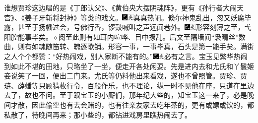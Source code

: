 谁想贾珍这边唱的是《丁郎认父》、《黄伯央大摆阴魂阵》，更有《孙行者大闹天宫》、《姜子牙斩将封神》等类的戏文。{\includegraphics[width=3mm]{../Images/00003}\includegraphics[width=3mm]{../Images/00012}\footnotesize \kaishu 真真热闹。}倏尔神鬼乱出，忽又妖魔毕露，甚至于扬幡过会，号佛行香，锣鼓喊叫之声远闻巷外。{\includegraphics[width=3mm]{../Images/00003}\includegraphics[width=3mm]{../Images/00012}\footnotesize \kaishu 形容刻薄之至，弋阳腔能事毕矣。{$\diamond$}阅至此则有如耳内喧哗、目中撩乱。后文至隔墙闻“袅晴丝”数曲，则有如魂随笛转、魄逐歌销。形容一事，一事毕真，石头是第一能手矣。}满街之人个个都赞：“好热闹戏，别人家断不能有的。”{\includegraphics[width=3mm]{../Images/00003}\includegraphics[width=3mm]{../Images/00012}\footnotesize \kaishu 必有之言。}宝玉见繁华热闹到如此不堪的田地，只略坐了一坐，便走开各处闲耍。先是进内去和尤氏和丫鬟姬妾说笑了一回，便出二门来。尤氏等仍料他出来看戏，遂也不曾照管。贾珍、贾琏、薛蟠等只顾猜枚行令，百般作乐，也不理论，纵一时不见他在座，只道在里边去了，故也不问。至于跟宝玉的小厮们，那年纪大些的，知宝玉这一来了，必是晚间才散，因此偷空也有去会赌的，也有往亲友家去吃年茶的，更有或嫖或饮的，都私散了，待晚间再来；那小些的，都钻进戏房里瞧热闹去了。

